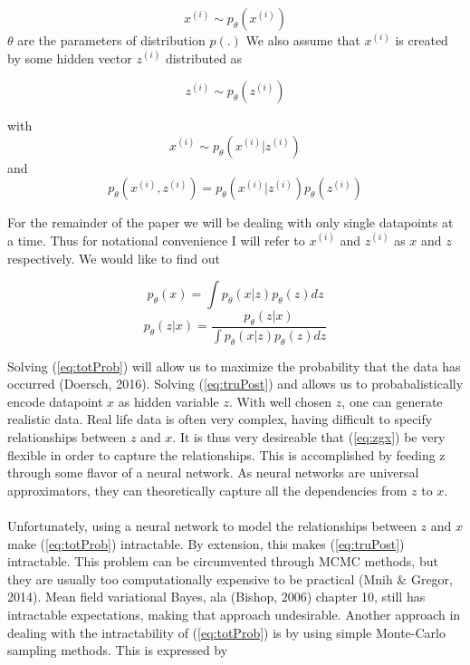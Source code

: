 \documentclass[10pt]{article}
\begin{document}
\begin{equation} \label{eq:x}
x^{(i)} \sim p_{\theta}{(x^{(i)})}  
\end{equation}
%
$\theta$ are the parameters of distribution $p(.)$  
We also assume that $x^{(i)}$ is created by some hidden 
vector $z^{(i)}$ distributed as 

\begin{equation} \label{eq:z}
z^{(i)} \sim p_{\theta}{(z^{(i)})}
\end{equation}

with
\begin{equation} \label{eq:zgx}
x^{(i)} \sim p_{\theta}(x^{(i)}|z^{(i)})  
\end{equation}
and
\begin{equation}\label{pxz}
p_{\theta}(x^{(i)},z^{(i)}) = p_{\theta}(x^{(i)}|z^{(i)})p_{\theta}{(z^{(i)})}
\end{equation}


For the remainder of the paper we will be dealing with only single datapoints
at a time.  Thus for notational convenience I will refer to $x^{(i)}$ and $z^{(i)}$ as 
$x$ and $z$ respectively. 
We would like to find out

\begin{equation} \label{eq:totProb}
p_{\theta}(x) = \int{p_{\theta}{(x|z)} {p_{\theta}{(z)}} dz} 
\end{equation}
\begin{equation} \label{eq:truPost}
p_{\theta}(z | x ) = \frac{p_{\theta}(z | x)} 
{\int{p_{\theta}{(x|z)} {p_{\theta}{(z)}} dz}} 
\end{equation}

Solving (\ref{eq:totProb}) will allow us to maximize the probability that the data
has occurred (Doersch, 2016).  Solving (\ref{eq:truPost}) and allows us to 
probabalistically encode datapoint $x$ as 
hidden variable $z$.  With well chosen $z$, one can generate realistic data.  
Real life data is often very complex, having difficult to specify relationships between
$z$ and $x$.  It is thus very desireable that (\ref{eq:zgx}) be very flexible in order
to capture the relationships.  
This is accomplished by feeding z through some flavor of a neural network.  As neural
networks are universal approximators, they can theoretically capture all the dependencies from
$z$ to $x$.    \\ \\
Unfortunately, using a neural network to model the relationships between $z$ and $x$  make  
(\ref{eq:totProb}) intractable.  By extension, this makes (\ref{eq:truPost}) intractable.   
This problem can be circumvented 
through MCMC methods, but they are usually too 
computationally expensive to be practical (Mnih \& Gregor, 2014).  Mean field variational Bayes,
ala (Bishop, 2006) chapter 10, still has intractable expectations, making that approach
undesirable.  Another approach in dealing with the intractability of (\ref{eq:totProb})
is by using simple Monte-Carlo sampling methods.  This is expressed by
\end{document}
